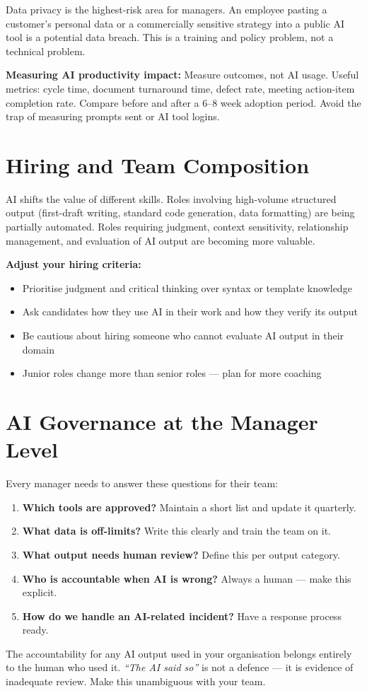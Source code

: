\begin{warnbox}
Data privacy is the highest-risk area for managers.
An employee pasting a customer's personal data or a commercially sensitive strategy
into a public AI tool is a potential data breach.
This is a training and policy problem, not a technical problem.
\end{warnbox}

\textbf{Measuring AI productivity impact:}
Measure outcomes, not AI usage.
Useful metrics: cycle time, document turnaround time, defect rate, meeting action-item
completion rate.
Compare before and after a 6--8 week adoption period.
Avoid the trap of measuring prompts sent or AI tool logins.

\section{Hiring and Team Composition}
\label{sec:hiring}

AI shifts the value of different skills.
Roles involving high-volume structured output (first-draft writing, standard code
generation, data formatting) are being partially automated.
Roles requiring judgment, context sensitivity, relationship management, and evaluation
of AI output are becoming more valuable.

\textbf{Adjust your hiring criteria:}
\begin{itemize}
  \item Prioritise judgment and critical thinking over syntax or template knowledge
  \item Ask candidates how they use AI in their work and how they verify its output
  \item Be cautious about hiring someone who cannot evaluate AI output in their domain
  \item Junior roles change more than senior roles --- plan for more coaching
\end{itemize}

\section{AI Governance at the Manager Level}
\label{sec:governance}

Every manager needs to answer these questions for their team:

\begin{enumerate}
  \item \textbf{Which tools are approved?} Maintain a short list and update it quarterly.
  \item \textbf{What data is off-limits?} Write this clearly and train the team on it.
  \item \textbf{What output needs human review?} Define this per output category.
  \item \textbf{Who is accountable when AI is wrong?} Always a human --- make this explicit.
  \item \textbf{How do we handle an AI-related incident?} Have a response process ready.
\end{enumerate}

\begin{infobox}
The accountability for any AI output used in your organisation belongs entirely to
the human who used it.
\textit{``The AI said so''} is not a defence --- it is evidence of inadequate review.
Make this unambiguous with your team.
\end{infobox}
